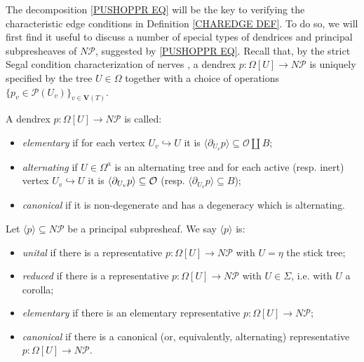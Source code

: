 \documentclass[a4paper,10pt
,draft
]{article}%
\renewcommand{\1}{\eta}%
\begin{document}
The decomposition \eqref{PUSHOPPR EQ}
will be the key to verifying the 
characteristic edge conditions in Definition \ref{CHAREDGE DEF}.
To do so, we will first find it useful to discuss a number of special types of dendrices and principal subpresheaves of $N \mathcal{P}$, suggested by \eqref{PUSHOPPR EQ}.
%
Recall that, by the strict Segal condition characterization of nerves \cite[Cor. 2.7]{CM13a},
a dendrex $p \colon \Omega[U] \to N \mathcal{P}$
is uniquely specified by the tree $U \in \Omega$ together with a choice of operations
$\{p_v \in \mathcal{P}(U_v)\}_{v \in \boldsymbol{V}(T)}$.


\begin{definition}
A dendrex $p\colon \Omega[U] \to N \mathcal{P}$ 
is called:
\begin{itemize}
\item \emph{elementary} if for each vertex $U_v \hookrightarrow U$
it is $\langle \partial_{U_v} p\rangle \subseteq \mathcal{O} \amalg B$; %
\item \emph{alternating} if $U \in \Omega^a$ is an alternating tree
and for each active (resp. inert) vertex 
$U_v \hookrightarrow U$ it is
$\langle \partial_{U_v} p \rangle \subseteq \mathcal{O}$
(resp. $\langle \partial_{U_v} p \rangle \subseteq B$);
\item \emph{canonical} if it is non-degenerate and has a degeneracy which is alternating.
\end{itemize}
\end{definition}


\begin{definition}
Let $\langle p \rangle \subseteq N \mathcal{P}$ be 
a principal subpresheaf. 
We say $\langle p \rangle$ is:
\begin{itemize}
\item \emph{unital} if there is a representative
$p\colon \Omega[U] \to N \mathcal{P}$ with $U=\eta$ the stick tree;
\item \emph{reduced} if there is a representative
$p\colon \Omega[U] \to N \mathcal{P}$ with $U \in \Sigma$, i.e. with $U$ a corolla;
\item \emph{elementary} 
if there is an elementary representative
$p\colon \Omega[U] \to N \mathcal{P}$;
\item \emph{canonical} 
if there is a canonical (or, equivalently, alternating) representative
$p\colon \Omega[U] \to N \mathcal{P}$.
\end{itemize}
\end{definition}
\end{document}
